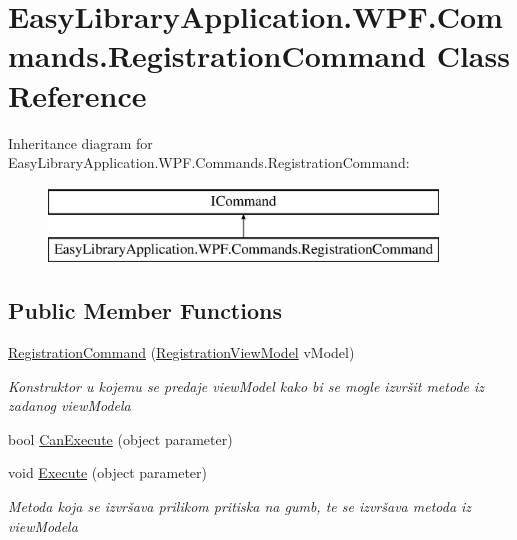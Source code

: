 \hypertarget{class_easy_library_application_1_1_w_p_f_1_1_commands_1_1_registration_command}{}\section{Easy\+Library\+Application.\+W\+P\+F.\+Commands.\+Registration\+Command Class Reference}
\label{class_easy_library_application_1_1_w_p_f_1_1_commands_1_1_registration_command}
Inheritance diagram for Easy\+Library\+Application.\+W\+P\+F.\+Commands.\+Registration\+Command\+:\begin{figure}[H]
\begin{center}
\leavevmode
\includegraphics[height=2.000000cm]{class_easy_library_application_1_1_w_p_f_1_1_commands_1_1_registration_command}
\end{center}
\end{figure}
\subsection*{Public Member Functions}
\begin{DoxyCompactItemize}
\item 
\mbox{\hyperlink{class_easy_library_application_1_1_w_p_f_1_1_commands_1_1_registration_command_a830045f8e9e7d2b018e8ce9c9361e2fc}{Registration\+Command}} (\mbox{\hyperlink{class_easy_library_application_1_1_w_p_f_1_1_view_model_1_1_registration_view_model}{Registration\+View\+Model}} v\+Model)
\begin{DoxyCompactList}\small\item\em Konstruktor u kojemu se predaje view\+Model kako bi se mogle izvršit metode iz zadanog view\+Modela \end{DoxyCompactList}\item 
bool \mbox{\hyperlink{class_easy_library_application_1_1_w_p_f_1_1_commands_1_1_registration_command_a9c3fc9db44e4b3ebdbfa0ffb98666b38}{Can\+Execute}} (object parameter)
\item 
void \mbox{\hyperlink{class_easy_library_application_1_1_w_p_f_1_1_commands_1_1_registration_command_a813f218d18ee3d9771918f388aaab1ba}{Execute}} (object parameter)
\begin{DoxyCompactList}\small\item\em Metoda koja se izvršava prilikom pritiska na gumb, te se izvršava metoda iz view\+Modela \end{DoxyCompactList}\end{DoxyCompactItemize}

